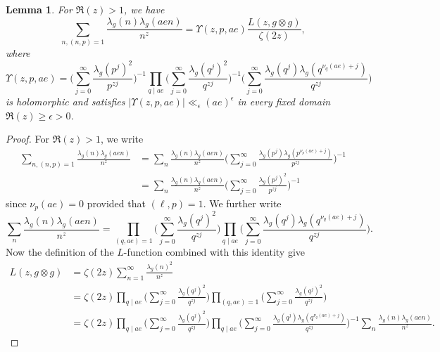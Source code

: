 \documentclass[12pt]{amsart}
\theoremstyle{plain}
\newtheorem{lem}{Lemma}[subsection]
\theoremstyle{definition}
\begin{document}
\begin{lem}
For $\Re(z)>1$, we have 
 \begin{equation*}
    \sum_{n, (n, p)=1}  \frac{\lambda_g(n)  \lambda_g(aen)}{n^{z}}
    =
    \Upsilon(z, p, ae) \frac{L(z, g\otimes g)}{\zeta(2z)},
    \end{equation*}
where \[
    \Upsilon(z, p, ae)
    =  \Big( \sum_{j=0}^\infty
    \frac{\lambda_g(p^j)^2}{p^{zj}}
    \Big)^{-1}
        \prod_{q\mid ae} 
         \Big( \sum_{j=0}^\infty
    \frac{\lambda_g(q^j)^2}{q^{zj}}
    \Big)^{-1}
     \Big( \sum_{j=0}^\infty
    \frac{\lambda_g(q^j) \lambda_g(q^{\nu_{q}(ae)+j})}{q^{zj}}
    \Big)
    \]
is holomorphic and satisfies  $\left|\Upsilon(z, p, ae)\right|\ll_{\epsilon} (ae)^\epsilon$ in every fixed domain  $\Re(z)\geq\epsilon>0$. 
\end{lem}
\begin{proof}
For $\Re(z)>1$, we write   \begin{align*}
    \sum_{n, (n, p)=1}  \frac{\lambda_g(n)  \lambda_g(aen)}{n^{z}}
    &= \sum_{n}  \frac{\lambda_g(n)  \lambda_g(aen)}{n^{z}}
    \Big( \sum_{j=0}^\infty
    \frac{\lambda_g(p^j) \lambda_g(p^{\nu_p(ae)+j})}{p^{zj}}
    \Big)^{-1} \\&=  \sum_{n}  \frac{\lambda_g(n)  \lambda_g(aen)}{n^{z}}
    \Big( \sum_{j=0}^\infty
    \frac{\lambda_g(p^j)^2 }{p^{zj}}
    \Big)^{-1}   \end{align*}
since  $\nu_p(ae)=0$ provided that $(\ell, p)=1$. We further write    \[
     \sum_{n}  \frac{\lambda_g(n)  \lambda_g(aen)}{n^{z}}
     =\prod_{(q, ae)=1} 
     \Big( \sum_{j=0}^\infty
    \frac{\lambda_g(q^j)^2}{q^{zj}}
    \Big)
    \prod_{q\mid ae} 
     \Big( \sum_{j=0}^\infty
    \frac{\lambda_g(q^j) \lambda_g(q^{\nu_{q}(ae)+j})}{q^{zj}}
    \Big).
    \]
Now the definition of the $L$-function combined with this identity give
    \begin{align*}
    L(z, g\otimes g)
   & = \zeta(2z) \sum_{n=1}^\infty \frac{\lambda_g(n)^2}{n^z}
    \\
    &= \zeta(2z) 
    \prod_{q \mid ae} 
     \Big( \sum_{j=0}^\infty
    \frac{\lambda_g(q^j)^2}{q^{zj}}
    \Big)
    \prod_{(q, ae)=1} 
     \Big( \sum_{j=0}^\infty
    \frac{\lambda_g(q^j)^2}{q^{zj}}
    \Big)
    \\
    &= \zeta(2z) 
    \prod_{q \mid ae} 
     \Big( \sum_{j=0}^\infty
    \frac{\lambda_g(q^j)^2}{q^{zj}}
    \Big)
    \prod_{q\mid ae} 
     \Big( \sum_{j=0}^\infty
    \frac{\lambda_g(q^j) \lambda_g(q^{\nu_{q}(ae)+j})}{q^{zj}}
    \Big)^{-1}
     \sum_{n}  \frac{\lambda_g(n)  \lambda_g(aen)}{n^{z}} .

\end{align*}
\end{proof}
\end{document}
